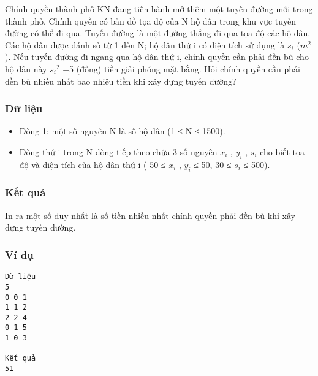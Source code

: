 



   Chính quyền thành phố KN đang tiến hành mở thêm một tuyến đường mới trong thành phố. Chính quyền có bản đồ tọa độ của N hộ dân trong khu vực tuyến đường có thể đi qua. Tuyến đường là một đường thẳng đi qua tọa độ các hộ dân. Các hộ dân được đánh số từ 1 đến N; hộ dân thứ i có diện tích sử dụng là $s_{i}$   ($m^{2}$   ). Nếu tuyến đường đi ngang qua hộ dân thứ i, chính quyền cần phải đền bù cho hộ dân này $s_{i}$$^    2   $   +5 (đồng) tiền giải phóng mặt bằng. Hỏi chính quyền cần phải đền bù nhiều nhất bao nhiêu tiền khi xây dựng tuyến đường?  

\subsubsection{   Dữ liệu  }
\begin{itemize}
	\item     Dòng 1: một số nguyên N là số hộ dân (1 ≤ N ≤ 1500).   
	\item     Dòng thứ i trong N dòng tiếp theo chứa 3 số nguyên $x_{i}$    , $y_{i}$    , $s_{i}$    cho biết tọa độ và diện tích của hộ dân thứ i (-50 ≤ $x_{i}$    , $y_{i}$    ≤ 50, 30 ≤ $s_{i}$    ≤ 500).   
\end{itemize}

\subsubsection{   Kết quả  }

   In ra một số duy nhất là số tiền nhiều nhất chính quyền phải đền bù khi xây dựng tuyến đường.  

\subsubsection{   Ví dụ  }
\begin{verbatim}
Dữ liệu
5
0 0 1
1 1 2
2 2 4
0 1 5
1 0 3

Kết quả	
51
\end{verbatim}
